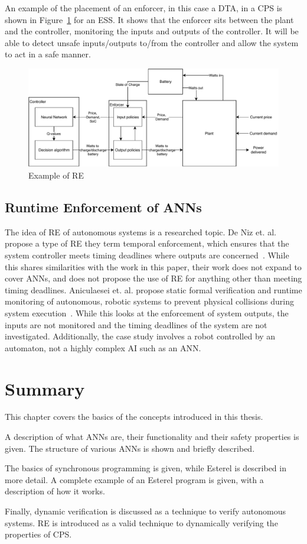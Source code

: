 An example of the placement of an enforcer, in this case a \ac{DTA}, in a \ac{CPS} is shown in Figure~\ref{fig:re} for an \acf{ESS}.
It shows that the enforcer sits between the plant and the controller, monitoring the inputs and outputs of the controller.
It will be able to detect unsafe inputs/outputs to/from the controller and allow the system to act in a safe manner.
\begin{figure}
	\centering
	\includegraphics[width=\textwidth]{Content/fig/ESS-RE.pdf}
	\caption{Example of \ac{RE} \label{fig:re}}
\end{figure}

\subsection{Runtime Enforcement of \acp{ANN}}
The idea of \ac{RE} of autonomous systems is a researched topic. 
De Niz et. al. propose a type of \ac{RE} they term temporal enforcement, which ensures that the system controller meets timing deadlines where outputs are concerned~\cite{safe-enforce-auto}. 
While this shares similarities with the work in this paper, their work does not expand to cover \acp{ANN}, and does not propose the use of \ac{RE} for anything other than meeting timing deadlines.
Aniculaesei et. al. propose static formal verification and runtime monitoring of autonomous, robotic systems to prevent physical collisions during system execution~\cite{runtime-monitor}.
While this looks at the enforcement of system outputs, the inputs are not monitored and the timing deadlines of the system are not investigated. 
Additionally, the case study involves a robot controlled by an automaton, not a highly complex \ac{AI} such as an \ac{ANN}.





\section{Summary}
This chapter covers the basics of the concepts introduced in this thesis.

A description of what \acp{ANN} are, their functionality and their safety properties is given.
The structure of various \acp{ANN} is shown and briefly described.

The basics of synchronous programming is given, while Esterel is described in more detail.
A complete example of an Esterel program is given, with a description of how it works.

Finally, dynamic verification is discussed as a technique to verify autonomous systems.
\ac{RE} is introduced as a valid technique to dynamically verifying the properties of \ac{CPS}.
